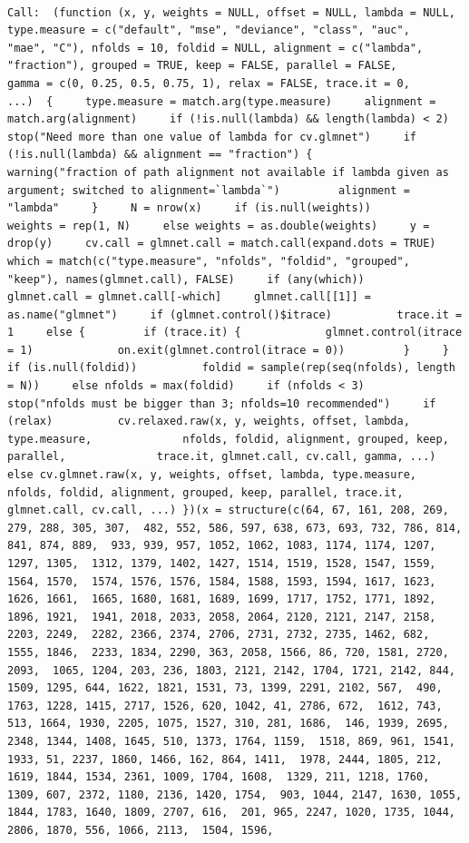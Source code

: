 \documentclass[
]{article}
\begin{document}
\begin{verbatim}

Call:  (function (x, y, weights = NULL, offset = NULL, lambda = NULL,      type.measure = c("default", "mse", "deviance", "class", "auc",          "mae", "C"), nfolds = 10, foldid = NULL, alignment = c("lambda",          "fraction"), grouped = TRUE, keep = FALSE, parallel = FALSE,      gamma = c(0, 0.25, 0.5, 0.75, 1), relax = FALSE, trace.it = 0,      ...)  {     type.measure = match.arg(type.measure)     alignment = match.arg(alignment)     if (!is.null(lambda) && length(lambda) < 2)          stop("Need more than one value of lambda for cv.glmnet")     if (!is.null(lambda) && alignment == "fraction") {         warning("fraction of path alignment not available if lambda given as argument; switched to alignment=`lambda`")         alignment = "lambda"     }     N = nrow(x)     if (is.null(weights))          weights = rep(1, N)     else weights = as.double(weights)     y = drop(y)     cv.call = glmnet.call = match.call(expand.dots = TRUE)     which = match(c("type.measure", "nfolds", "foldid", "grouped",          "keep"), names(glmnet.call), FALSE)     if (any(which))          glmnet.call = glmnet.call[-which]     glmnet.call[[1]] = as.name("glmnet")     if (glmnet.control()$itrace)          trace.it = 1     else {         if (trace.it) {             glmnet.control(itrace = 1)             on.exit(glmnet.control(itrace = 0))         }     }     if (is.null(foldid))          foldid = sample(rep(seq(nfolds), length = N))     else nfolds = max(foldid)     if (nfolds < 3)          stop("nfolds must be bigger than 3; nfolds=10 recommended")     if (relax)          cv.relaxed.raw(x, y, weights, offset, lambda, type.measure,              nfolds, foldid, alignment, grouped, keep, parallel,              trace.it, glmnet.call, cv.call, gamma, ...)     else cv.glmnet.raw(x, y, weights, offset, lambda, type.measure,          nfolds, foldid, alignment, grouped, keep, parallel, trace.it,          glmnet.call, cv.call, ...) })(x = structure(c(64, 67, 161, 208, 269, 279, 288, 305, 307,  482, 552, 586, 597, 638, 673, 693, 732, 786, 814, 841, 874, 889,  933, 939, 957, 1052, 1062, 1083, 1174, 1174, 1207, 1297, 1305,  1312, 1379, 1402, 1427, 1514, 1519, 1528, 1547, 1559, 1564, 1570,  1574, 1576, 1576, 1584, 1588, 1593, 1594, 1617, 1623, 1626, 1661,  1665, 1680, 1681, 1689, 1699, 1717, 1752, 1771, 1892, 1896, 1921,  1941, 2018, 2033, 2058, 2064, 2120, 2121, 2147, 2158, 2203, 2249,  2282, 2366, 2374, 2706, 2731, 2732, 2735, 1462, 682, 1555, 1846,  2233, 1834, 2290, 363, 2058, 1566, 86, 720, 1581, 2720, 2093,  1065, 1204, 203, 236, 1803, 2121, 2142, 1704, 1721, 2142, 844,  1509, 1295, 644, 1622, 1821, 1531, 73, 1399, 2291, 2102, 567,  490, 1763, 1228, 1415, 2717, 1526, 620, 1042, 41, 2786, 672,  1612, 743, 513, 1664, 1930, 2205, 1075, 1527, 310, 281, 1686,  146, 1939, 2695, 2348, 1344, 1408, 1645, 510, 1373, 1764, 1159,  1518, 869, 961, 1541, 1933, 51, 2237, 1860, 1466, 162, 864, 1411,  1978, 2444, 1805, 212, 1619, 1844, 1534, 2361, 1009, 1704, 1608,  1329, 211, 1218, 1760, 1309, 607, 2372, 1180, 2136, 1420, 1754,  903, 1044, 2147, 1630, 1055, 1844, 1783, 1640, 1809, 2707, 616,  201, 965, 2247, 1020, 1735, 1044, 2806, 1870, 556, 1066, 2113,  1504, 1596, 
\end{verbatim}
\end{document}
